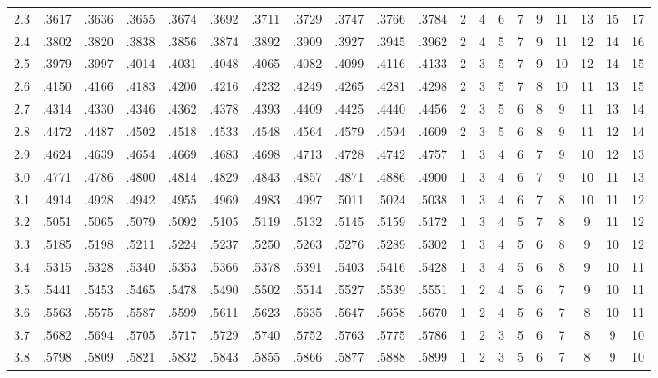 {\begin{tabular}{|c|cccccccccc|ccccccccc|}
2.3 & .3617 & .3636 & .3655 & .3674 & .3692 & .3711 & .3729 & .3747 & .3766 & .3784 & 2 & 4 & 6 & 7 & 9 & 11 & 13 & 15 & 17 \\
2.4 & .3802 & .3820 & .3838 & .3856 & .3874 & .3892 & .3909 & .3927 & .3945 & .3962 & 2 & 4 & 5 & 7 & 9 & 11 & 12 & 14 & 16 \\
2.5 & .3979 & .3997 & .4014 & .4031 & .4048 & .4065 & .4082 & .4099 & .4116 & .4133 & 2 & 3 & 5 & 7 & 9 & 10 & 12 & 14 & 15 \\
2.6 & .4150 & .4166 & .4183 & .4200 & .4216 & .4232 & .4249 & .4265 & .4281 & .4298 & 2 & 3 & 5 & 7 & 8 & 10 & 11 & 13 & 15 \\
2.7 & .4314 & .4330 & .4346 & .4362 & .4378 & .4393 & .4409 & .4425 & .4440 & .4456 & 2 & 3 & 5 & 6 & 8 & 9 & 11 & 13 & 14 \\
2.8 & .4472 & .4487 & .4502 & .4518 & .4533 & .4548 & .4564 & .4579 & .4594 & .4609 & 2 & 3 & 5 & 6 & 8 & 9 & 11 & 12 & 14 \\
2.9 & .4624 & .4639 & .4654 & .4669 & .4683 & .4698 & .4713 & .4728 & .4742 & .4757 & 1 & 3 & 4 & 6 & 7 & 9 & 10 & 12 & 13 \\
3.0 & .4771 & .4786 & .4800 & .4814 & .4829 & .4843 & .4857 & .4871 & .4886 & .4900 & 1 & 3 & 4 & 6 & 7 & 9 & 10 & 11 & 13 \\
3.1 & .4914 & .4928 & .4942 & .4955 & .4969 & .4983 & .4997 & .5011 & .5024 & .5038 & 1 & 3 & 4 & 6 & 7 & 8 & 10 & 11 & 12 \\
3.2 & .5051 & .5065 & .5079 & .5092 & .5105 & .5119 & .5132 & .5145 & .5159 & .5172 & 1 & 3 & 4 & 5 & 7 & 8 & 9 & 11 & 12 \\
3.3 & .5185 & .5198 & .5211 & .5224 & .5237 & .5250 & .5263 & .5276 & .5289 & .5302 & 1 & 3 & 4 & 5 & 6 & 8 & 9 & 10 & 12 \\
3.4 & .5315 & .5328 & .5340 & .5353 & .5366 & .5378 & .5391 & .5403 & .5416 & .5428 & 1 & 3 & 4 & 5 & 6 & 8 & 9 & 10 & 11 \\
3.5 & .5441 & .5453 & .5465 & .5478 & .5490 & .5502 & .5514 & .5527 & .5539 & .5551 & 1 & 2 & 4 & 5 & 6 & 7 & 9 & 10 & 11 \\
3.6 & .5563 & .5575 & .5587 & .5599 & .5611 & .5623 & .5635 & .5647 & .5658 & .5670 & 1 & 2 & 4 & 5 & 6 & 7 & 8 & 10 & 11 \\
3.7 & .5682 & .5694 & .5705 & .5717 & .5729 & .5740 & .5752 & .5763 & .5775 & .5786 & 1 & 2 & 3 & 5 & 6 & 7 & 8 & 9 & 10 \\
3.8 & .5798 & .5809 & .5821 & .5832 & .5843 & .5855 & .5866 & .5877 & .5888 & .5899 & 1 & 2 & 3 & 5 & 6 & 7 & 8 & 9 & 10 \\

\end{tabular}}
